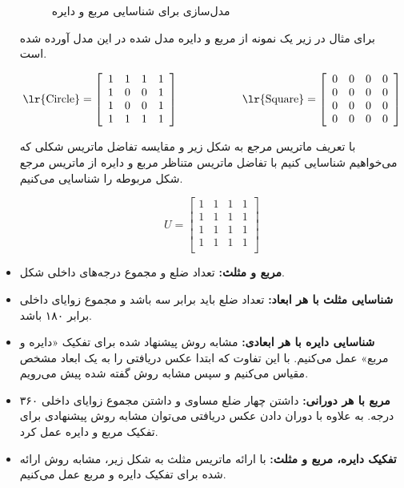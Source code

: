\documentclass[14pt,a4]{article}
\begin{document}
\begin{itemize}
\begin{figure}[h]
\begin{subfigure}{0.45\textwidth}
        \end{subfigure}
        \caption{مدل‌سازی برای شناسایی مربع و دایره}
        \label{circle-and-square-recongition}
    \end{figure}

    برای مثال در زیر یک نمونه از مربع و دایره مدل شده
    در این مدل آورده شده است.

    \[
        \text{\lr{Circle}} = \left[ \begin{array}{cccc}
        1 & 1 & 1 & 1 \\
        1 & 0 & 0 & 1 \\
        1 & 0 & 0 & 1 \\
        1 & 1 & 1 & 1 \\
        \end{array} \right]
        \hspace{2cm}
        \text{\lr{Square}} = \left[ \begin{array}{cccc}
        0 & 0 & 0 & 0 \\
        0 & 0 & 0 & 0 \\
        0 & 0 & 0 & 0 \\
        0 & 0 & 0 & 0 \\
        \end{array} \right]
    \]

    با تعریف ماتریس مرجع به شکل زیر و مقایسه‌ تفاضل ماتریس شکلی که می‌خواهیم شناسایی کنیم با تفاضل
    ماتریس  متناظر مربع و دایره از ماتریس مرجع شکل مربوطه را شناسایی می‌کنیم.

    \[
        U = \left[ \begin{array}{cccc}
        1 & 1 & 1 & 1 \\
        1 & 1 & 1 & 1 \\
        1 & 1 & 1 & 1 \\
        1 & 1 & 1 & 1 \\
        \end{array} \right]
    \]

    \item \textbf{مربع و مثلث:} تعداد ضلع و مجموع درجه‌های داخلی شکل.
    \item \textbf{شناسایی مثلث با هر ابعاد:} تعداد ضلع باید برابر سه باشد و مجموع زوایای داخلی برابر ۱۸۰ باشد.
    \item \textbf{شناسایی دایره با هر ابعادی:} مشابه روش پیشنهاد شده برای تفکیک «دایره و مربع» عمل می‌کنیم.
    با این تفاوت که ابتدا عکس دریافتی را به یک ابعاد مشخص مقیاس می‌کنیم و سپس مشابه روش گفته شده پیش می‌رویم.
    \item \textbf{مربع با هر دورانی:} داشتن چهار ضلع مساوی و داشتن مجموع زوایای داخلی ۳۶۰ درجه. به علاوه با
    دوران دادن عکس دریافتی می‌توان مشابه روش پیشنهادی برای تفکیک مربع و دایره عمل کرد.
    \item \textbf{تفکیک دایره، مربع و مثلث:} با ارائه ماتریس مثلث به شکل زیر، مشابه روش ارائه شده برای
    تفکیک دایره و مربع عمل می‌کنیم.


\end{itemize}
\end{document}
